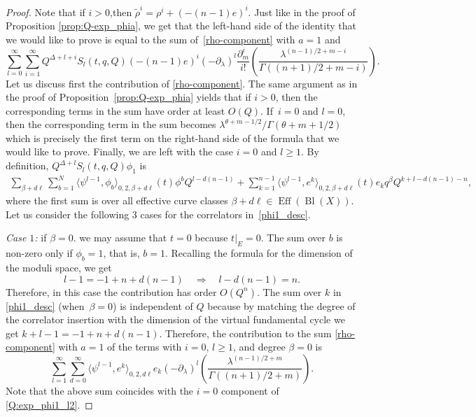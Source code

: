 \documentclass[pdftex]{sigma}
\numberwithin{equation}{section}
\begin{document}
\begin{proof}
Note that if $i>0$,then $\widetilde{\rho}^i=\rho^i+(-(n-1)e)^i.$
Just like in the proof of Proposition \ref{prop:Q-exp_phia}, we get that the left-hand side of the identity that we would like to prove is equal to the sum of~\eqref{rho-component} with $a=1$ and
\begin{equation}\label{e-component}
\sum_{l=0}^\infty
\sum_{i=1}^\infty
Q^{\Delta+l+i} S_l(t,q,Q) (-(n-1)e)^i
(-\partial_\lambda)^l
\frac{\partial_m^i}{i!}\left(
\frac{\lambda^{(n-1)/2+m-i}}{
\Gamma((n+1)/2+m-i)}
\right).
\end{equation}
Let us discuss first the contribution of \eqref{rho-component}. The same argument as in the proof of Proposition~\ref{prop:Q-exp_phia} yields that if $i>0$, then the corresponding terms in the sum have order at least $O(Q)$. If~$i=0$ and $l=0$, then the corresponding term in the sum becomes $\lambda^{\theta+m-1/2}/\Gamma(\theta+m+1/2)$ which is precisely the first term on the right-hand side of the formula that we would like to prove.
Finally, we are left with the case $i=0$ and $l\geq 1$. By definition, $Q^{\Delta+l}S_l(t,q,Q)\phi_1$ is
\begin{gather}\label{phi1_desc}
\sum_{\beta+d\ell }\!
\sum_{b=1}^N\!
\big\langle \psi^{l-1},\phi_b\big\rangle_{0,2,\beta+d\ell} (t) \phi^b Q^{l-d(n-1)} +
\!\sum_{k=1}^{n-1}\!
\big\langle \psi^{l-1}, e^k\big\rangle_{0,2,\beta+d\ell} (t) e_k q^\beta Q^{k+l-d(n-1)-n},\!\!\!
\end{gather}
where the first sum is over all effective curve classes $\beta+d\ell\in \operatorname{Eff}(\operatorname{Bl}(X))$. Let us consider the following 3 cases for the correlators in~\eqref{phi1_desc}.

{\em Case $1$:} if $\beta=0$. we may assume that $t=0$ because $t|_E=0$. The sum over $b$ is non-zero only if $\phi_b=1$, that is, $b=1$. Recalling the formula for the dimension of the moduli space, we get
\[
l-1= -1+n+d(n-1)\quad\Rightarrow\quad
l-d(n-1) = n.
\]
Therefore, in this case the contribution has order $O(Q^n)$. The sum over $k$ in \eqref{phi1_desc} (when~$\beta=0$) is independent of $Q$ because by matching the degree of the correlator insertion with the dimension of the virtual fundamental cycle we get $k+l-1=-1+n+d(n-1)$. Therefore, the contribution to the sum \eqref{rho-component} with $a=1$ of the terms with $i=0$, $l\geq 1$, and degree $\beta=0$ is
\[
\sum_{l=1}^\infty
\sum_{d=0}^\infty
\big\langle \psi^{l-1}, e^k\big\rangle_{0,2,d\ell}
e_k
(-\partial_\lambda)^l
\left(
\frac{\lambda^{(n-1)/2+m}}{
\Gamma((n+1)/2+m)}
\right).
\]
Note that the above sum coincides with the $i=0$ component of \eqref{Q:exp_phi1_l2}.


\end{proof}
\end{document}
